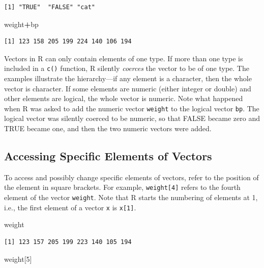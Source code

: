 \documentclass[
]{krantz}
\makeatletter
\newenvironment{Shaded}{\begin{snugshade}}{\end{snugshade}}
\newcommand{\DecValTok}[1]{\textcolor[rgb]{0.06,0.06,0.06}{#1}}
\newcommand{\NormalTok}[1]{#1}
\newcommand{\OperatorTok}[1]{\textcolor[rgb]{0.43,0.43,0.43}{\textbf{#1}}}
\newenvironment{kframe}{%
\medskip{}
\setlength{\fboxsep}{.8em}
 \def\at@end@of@kframe{}%
 \ifinner\ifhmode%
  \def\at@end@of@kframe{\end{minipage}}%
  \begin{minipage}{\columnwidth}%
 \fi\fi%
 \def\FrameCommand##1{\hskip\@totalleftmargin \hskip-\fboxsep
 \colorbox{shadecolor}{##1}\hskip-\fboxsep
     \hskip-\linewidth \hskip-\@totalleftmargin \hskip\columnwidth}%
 \MakeFramed {\advance\hsize-\width
   \@totalleftmargin\z@ \linewidth\hsize
   \@setminipage}}%
 {\par\unskip\endMakeFramed%
 \at@end@of@kframe}
\renewenvironment{Shaded}{\begin{kframe}}{\end{kframe}}
\makeatother
\begin{document}
\begin{verbatim}
[1] "TRUE"  "FALSE" "cat"  
\end{verbatim}

\begin{Shaded}
\begin{Highlighting}[]
\NormalTok{weight}\OperatorTok{+}\NormalTok{bp}
\end{Highlighting}
\end{Shaded}

\begin{verbatim}
[1] 123 158 205 199 224 140 106 194
\end{verbatim}

Vectors in R can only contain elements of one type. If more than one type is included in a \texttt{c()} function, R silently \emph{coerces} the vector to be of one type. The examples illustrate the hierarchy---if any element is a character, then the whole vector is character. If some elements are numeric (either integer or double) and other elements are logical, the whole vector is numeric. Note what happened when R was asked to add the numeric vector \texttt{weight} to the logical vector \texttt{bp}. The logical vector was silently coerced to be numeric, so that FALSE became zero and TRUE became one, and then the two numeric vectors were added.

\hypertarget{accessing-specific-elements-of-vectors}{%
\subsection{Accessing Specific Elements of Vectors}\label{accessing-specific-elements-of-vectors}}

To access and possibly change specific elements of vectors, refer to the position of the element in square brackets. For example, \texttt{weight{[}4{]}} refers to the fourth element of the vector \texttt{weight}. Note that R starts the numbering of elements at 1, i.e., the first element of a vector \texttt{x} is \texttt{x{[}1{]}}.

\begin{Shaded}
\begin{Highlighting}[]
\NormalTok{weight}
\end{Highlighting}
\end{Shaded}

\begin{verbatim}
[1] 123 157 205 199 223 140 105 194
\end{verbatim}

\begin{Shaded}
\begin{Highlighting}[]
\NormalTok{weight[}\DecValTok{5}\NormalTok{]}
\end{Highlighting}
\end{Shaded}
\end{document}
